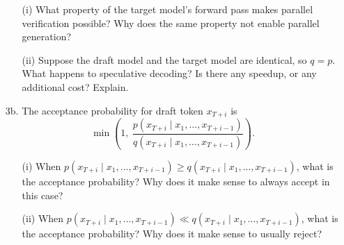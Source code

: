 \documentclass[submit]{harvardml}
\begin{document}
\begin{framed}
\begin{enumerate}
  \begin{enumerate}
    \item[(i)] What property of the target model's forward pass makes parallel verification possible? Why does the same property not enable parallel generation?
    \item[(ii)] Suppose the draft model and the target model are identical, so $q = p$. What happens to speculative decoding? Is there any speedup, or any additional cost? Explain.
  \end{enumerate}
  
  \item[3b.] The acceptance probability for draft token $x_{T+i}$ is
  \[
  \min\!\left(1, \ \frac{p(x_{T+i} \mid x_1, \ldots, x_{T+i-1})}{q(x_{T+i} \mid x_1, \ldots, x_{T+i-1})}\right).
  \]
  
  \begin{enumerate}
    \item[(i)] When $p(x_{T+i} \mid x_1, \ldots, x_{T+i-1}) \geq q(x_{T+i} \mid x_1, \ldots, x_{T+i-1})$, what is the acceptance probability? Why does it make sense to always accept in this case?
    \item[(ii)] When $p(x_{T+i} \mid x_1, \ldots, x_{T+i-1}) \ll q(x_{T+i} \mid x_1, \ldots, x_{T+i-1})$, what is the acceptance probability? Why does it make sense to usually reject?
  \end{enumerate}
\end{enumerate}
\end{framed}

\newpage
\end{document}
